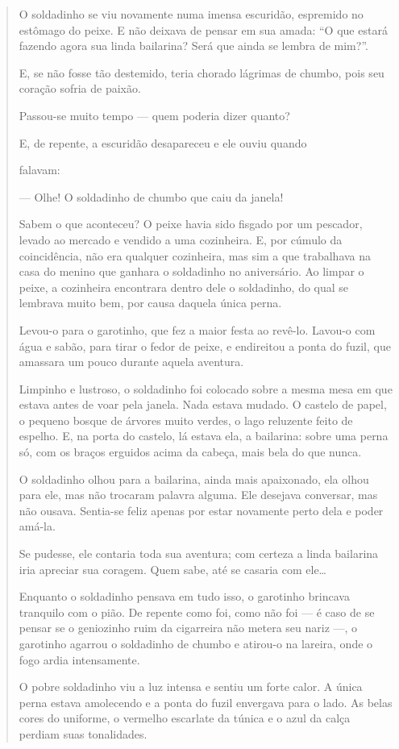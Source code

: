 \begin{itemize}
{{{\begin{itemize}
\begin{itemize}
\begin{itemize}
\begin{quote}
O soldadinho se viu novamente numa imensa escuridão, espremido no
estômago do peixe. E não deixava de pensar em sua amada: ``O que estará
fazendo agora sua linda bailarina? Será que ainda se lembra de mim?''.

E, se não fosse tão destemido, teria chorado lágrimas de chumbo, pois
seu coração sofria de paixão.

Passou-se muito tempo --- quem poderia dizer quanto?

E, de repente, a escuridão desapareceu e ele ouviu quando

falavam:

--- Olhe! O soldadinho de chumbo que caiu da janela!

Sabem o que aconteceu? O peixe havia sido fisgado por um pescador,
levado ao mercado e vendido a uma cozinheira. E, por cúmulo da
coincidência, não era qualquer cozinheira, mas sim a que trabalhava na
casa do menino que ganhara o soldadinho no aniversário. Ao limpar o
peixe, a cozinheira encontrara dentro dele o soldadinho, do qual se
lembrava muito bem, por causa daquela única perna.

Levou-o para o garotinho, que fez a maior festa ao revê-lo. Lavou-o com
água e sabão, para tirar o fedor de peixe, e endireitou a ponta do
fuzil, que amassara um pouco durante aquela aventura.

Limpinho e lustroso, o soldadinho foi colocado sobre a mesma mesa em que
estava antes de voar pela janela. Nada estava mudado. O castelo de
papel, o pequeno bosque de árvores muito verdes, o lago reluzente feito
de espelho. E, na porta do castelo, lá estava ela, a bailarina: sobre
uma perna só, com os braços erguidos acima da cabeça, mais bela do que
nunca.

O soldadinho olhou para a bailarina, ainda mais apaixonado, ela olhou
para ele, mas não trocaram palavra alguma. Ele desejava conversar, mas
não ousava. Sentia-se feliz apenas por estar novamente perto dela e
poder amá-la.

Se pudesse, ele contaria toda sua aventura; com certeza a linda
bailarina iria apreciar sua coragem. Quem sabe, até se casaria com
ele\ldots{}

Enquanto o soldadinho pensava em tudo isso, o garotinho brincava
tranquilo com o pião. De repente como foi, como não foi --- é caso de se
pensar se o geniozinho ruim da cigarreira não metera seu nariz ---, o
garotinho agarrou o soldadinho de chumbo e atirou-o na lareira, onde o
fogo ardia intensamente.

O pobre soldadinho viu a luz intensa e sentiu um forte calor. A única
perna estava amolecendo e a ponta do fuzil envergava para o lado. As
belas cores do uniforme, o vermelho escarlate da túnica e o azul da
calça perdiam suas tonalidades.


\end{quote}
\end{itemize}
\end{itemize}
\end{itemize}}}}
\end{itemize}
